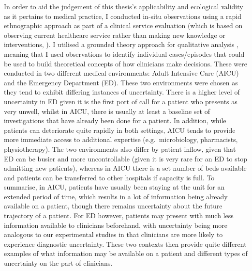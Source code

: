 \documentclass[a4paper, nobind]{templates/ociamthesis}
\begin{document}
In order to aid the judgement of this thesis's applicability and ecological validity as it pertains to medical practice, I conducted in-situ observations using a rapid ethnographic approach \autocite{vindrola-padros_quick_2018} as part of a clinical service evaluation (which is based on observing current healthcare service rather than making new knowledge or interventions, \textcite{twycross_service_2014}). I utilised a grounded theory approach for qualitative analysis \autocite{smith1995}, meaning that I used observations to identify individual cases/episodes that could be used to build theoretical concepts of how clinicians make decisions. These were conducted in two different medical environments: Adult Intensive Care (AICU) and the Emergency Department (ED). These two environments were chosen as they tend to exhibit differing instances of uncertainty. There is a higher level of uncertainty in ED given it is the first port of call for a patient who presents as very unwell, whilst in AICU, there is usually at least a baseline set of investigations that have already been done for a patient. In addition, while patients can deteriorate quite rapidly in both settings, AICU tends to provide more immediate access to additional expertise (e.g.~microbiology, pharmacists, physiotherapy). The two environments also differ by patient inflow, given that ED can be busier and more uncontrollable (given it is very rare for an ED to stop admitting new patients), whereas in AICU there is a set number of beds available and patients can be transferred to other hospitals if capacity is full. To summarise, in AICU, patients have usually been staying at the unit for an extended period of time, which results in a lot of information being already available on a patient, though there remains uncertainty about the future trajectory of a patient. For ED however, patients may present with much less information available to clinicians beforehand, with uncertainty being more analogous to our experimental studies in that clinicians are more likely to experience diagnostic uncertainty. These two contexts then provide quite different examples of what information may be available on a patient and different types of uncertainty on the part of clinicians.
\end{document}
